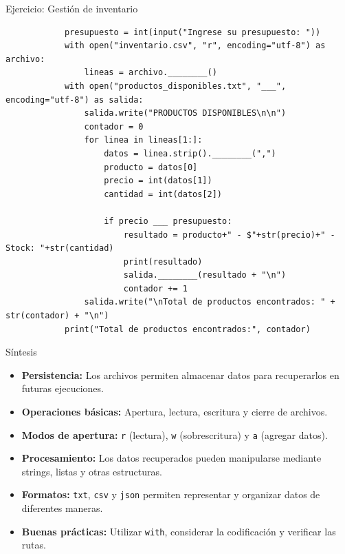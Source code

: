 \documentclass{beamer}
\begin{document}
    \begin{frame}[fragile, t]{Ejercicio: Gestión de inventario}
        \vspace{-0.1cm}
        \begin{verbatim}
            presupuesto = int(input("Ingrese su presupuesto: "))
            with open("inventario.csv", "r", encoding="utf-8") as archivo:
                lineas = archivo.________()
            with open("productos_disponibles.txt", "___", encoding="utf-8") as salida:
                salida.write("PRODUCTOS DISPONIBLES\n\n")
                contador = 0
                for linea in lineas[1:]:
                    datos = linea.strip().________(",")
                    producto = datos[0]
                    precio = int(datos[1])
                    cantidad = int(datos[2])

                    if precio ___ presupuesto:
                        resultado = producto+" - $"+str(precio)+" - Stock: "+str(cantidad)
                        print(resultado)
                        salida.________(resultado + "\n")
                        contador += 1
                salida.write("\nTotal de productos encontrados: " + str(contador) + "\n")
            print("Total de productos encontrados:", contador)
        \end{verbatim}
    \end{frame}

    \begin{frame}[fragile, t]{Síntesis}
        \begin{itemize}
            \item \textbf{Persistencia:} Los archivos permiten almacenar
            datos para recuperarlos en futuras ejecuciones.

            \pause
            \item \textbf{Operaciones básicas:} Apertura, lectura,
            escritura y cierre de archivos.

            \pause
            \item \textbf{Modos de apertura:} \texttt{r} (lectura),
            \texttt{w} (sobrescritura) y \texttt{a} (agregar datos).

            \pause
            \item \textbf{Procesamiento:} Los datos recuperados pueden
            manipularse mediante strings, listas y otras estructuras.

            \pause
            \item \textbf{Formatos:} \texttt{txt}, \texttt{csv} y \texttt{json} permiten representar
            y organizar datos de diferentes maneras.

            \pause
            \item \textbf{Buenas prácticas:} Utilizar \texttt{with},
            considerar la codificación y verificar las rutas.
        \end{itemize}
    \end{frame}
\end{document}
